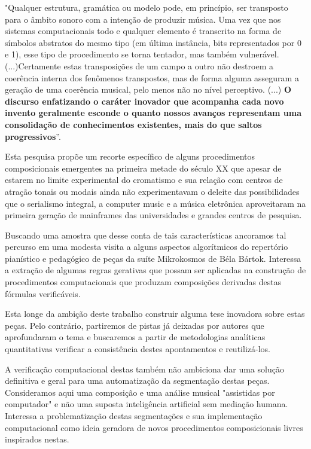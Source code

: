 \documentclass[
	12pt,				%
	openright,			%
	twoside,			%
	a4paper,			%
	english,			%
	french,				%
	spanish,			%
	brazil				%
	]{abntex2}
\begin{document}
\begin{citacao}
"Qualquer estrutura, gramática ou modelo pode, em princípio, ser transposto para o âmbito sonoro com a intenção de produzir música. Uma vez que nos sistemas computacionais todo e qualquer elemento é transcrito na forma de símbolos abstratos do mesmo tipo (em última instância, bits representados por 0 e 1), esse tipo de procedimento se torna tentador, mas também vulnerável.(...)Certamente estas transposições de um campo a outro não destroem a coerência interna dos fenômenos transpostos, mas de forma alguma asseguram a  geração de uma coerência musical, pelo menos não no nível perceptivo.
(...)
\textbf{O discurso enfatizando o caráter inovador que acompanha cada novo invento geralmente esconde o quanto nossos avanços representam uma consolidação  de conhecimentos existentes, mais do que saltos progressivos}”. \cite[p. 151-153, grifo nosso.]{iazzetta2009musica}
\end{citacao}

Esta pesquisa propõe um recorte específico de alguns procedimentos composicionais emergentes na primeira metade do século XX que apesar de estarem no limite experimental do cromatismo e sua relação com centros de atração tonais ou modais ainda não experimentavam o deleite das possibilidades que o serialismo integral, a computer music e a música eletrônica aproveitaram na primeira geração de mainframes das universidades e grandes centros de pesquisa.

Buscando uma amostra que desse conta de tais características ancoramos tal percurso em uma modesta visita a alguns aspectos algorítmicos do repertório pianístico e pedagógico de peças da suíte Mikrokosmos de Béla Bártok. Interessa a extração de algumas regras gerativas que possam ser aplicadas na construção de procedimentos computacionais que produzam composições derivadas destas fórmulas verificáveis. 

Esta longe da ambição deste trabalho construir alguma tese inovadora sobre estas peças. Pelo contrário, partiremos de pistas já deixadas por autores que aprofundaram o tema \cite{marshall1946analysis, suchoff1971guide, lendvai1971bela,  antokoletz1984music,suchoff2004bartok} e buscaremos a partir de metodologias analíticas quantitativas verificar a consistência destes apontamentos e reutilizá-los.

A verificação computacional destas também não ambiciona dar uma solução definitiva e geral para uma automatização da segmentação destas peças. Consideramos aqui uma composição e uma análise musical "assistidas por computador" e não uma suposta inteligência artificial sem mediação humana. Interessa a problematização destas segmentações e sua implementação computacional como ideia geradora de novos procedimentos composicionais livres inspirados nestas.
\end{document}
